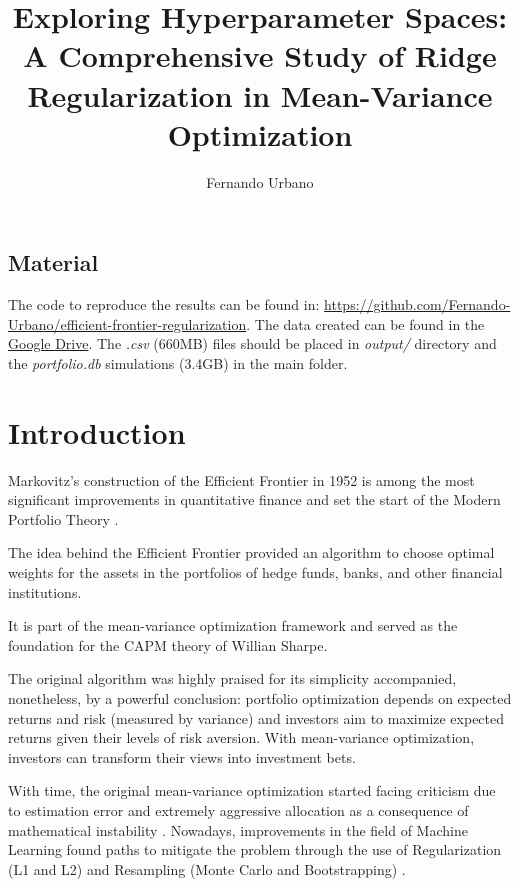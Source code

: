 \documentclass{article}
\title{Exploring Hyperparameter Spaces: A Comprehensive Study of Ridge Regularization in Mean-Variance Optimization}
\author{Fernando Urbano}
\begin{document}
\maketitle

\FloatBarrier
\subsection*{Material}
The code to reproduce the results can be found in: \href{https://github.com/Fernando-Urbano/efficient-frontier-regularization}{https://github.com/Fernando-Urbano/efficient-frontier-regularization}. The data created can be found in the \href{https://drive.google.com/drive/folders/17q4Golm0GLAndyc20SKOUCcmOOtqyd91?usp=sharing}{Google Drive}. The \textit{.csv} (660MB) files should be placed in \textit{output/} directory and the \textit{portfolio.db} simulations (3.4GB) in the main folder.

\FloatBarrier
\section{Introduction}

Markovitz's construction of the Efficient Frontier in 1952 is among the most significant improvements in quantitative finance and set the start of the Modern Portfolio Theory \cite{markowitz1952portfolio}.

The idea behind the Efficient Frontier provided an algorithm to choose optimal weights for the assets in the portfolios of hedge funds, banks, and other financial institutions.

It is part of the mean-variance optimization framework and served as the foundation for the CAPM theory of Willian Sharpe.

The original algorithm was highly praised for its simplicity accompanied, nonetheless, by a powerful conclusion: portfolio optimization depends on expected returns and risk (measured by variance) and investors aim to maximize expected returns given their levels of risk aversion. With mean-variance optimization, investors can transform their views into investment bets.

With time, the original mean-variance optimization started facing criticism due to estimation error and extremely aggressive allocation as a consequence of mathematical instability \cite{schmid2018efficient}. Nowadays, improvements in the field of Machine Learning found paths to mitigate the problem through the use of Regularization (L1 and L2) \cite{britten2013robustifying} and Resampling (Monte Carlo and Bootstrapping) \cite{bruder2013regularization}.
\end{document}
